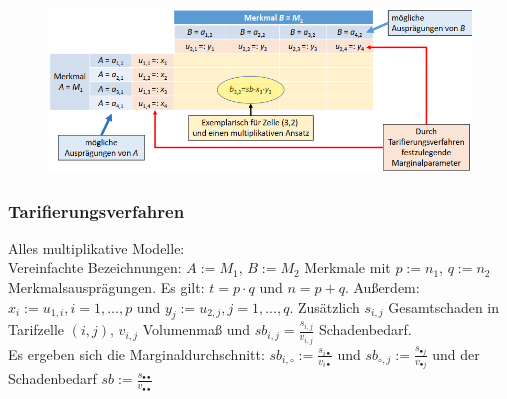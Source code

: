 \documentclass[12pt]{report}
\theoremstyle{dotless}
\theoremstyle{definition}
\begin{document}
\begin{figure}[ht]
	\centering
	\includegraphics[width = .8\textwidth]{Bilder/Tarifierung2.png}
\end{figure}



\subsubsection{Tarifierungsverfahren}
Alles multiplikative Modelle: \\
Vereinfachte Bezeichnungen: $A:=M_1$, $B:=M_2$ Merkmale mit $p:=n_1$, $q:=n_2$ Merkmalsausprägungen. Es gilt: $t=p\cdot q$ und $n=p+q$. Außerdem: $x_i:=u_{1,i}, i=1, ...,p$ und $y_j:=u_{2,j}, j=1,...,q$. Zusätzlich $s_{i,j}$ Gesamtschaden in Tarifzelle $(i,j)$, $v_{i,j}$ Volumenmaß und $sb_{i,j}=\frac{s_{i,j}}{v_{i,j}}$ Schadenbedarf. \\
Es ergeben sich die Marginaldurchschnitt: $sb_{i,\circ}:=\frac{s_{i \bullet}}{v_{i\bullet}}$ und $sb_{\circ, j} := \frac{s_{\bullet j}}{v_{\bullet j}}$ und der Schadenbedarf $sb:=\frac{s_{\bullet \bullet}}{v_{\bullet \bullet}}$ \\
\end{document}
